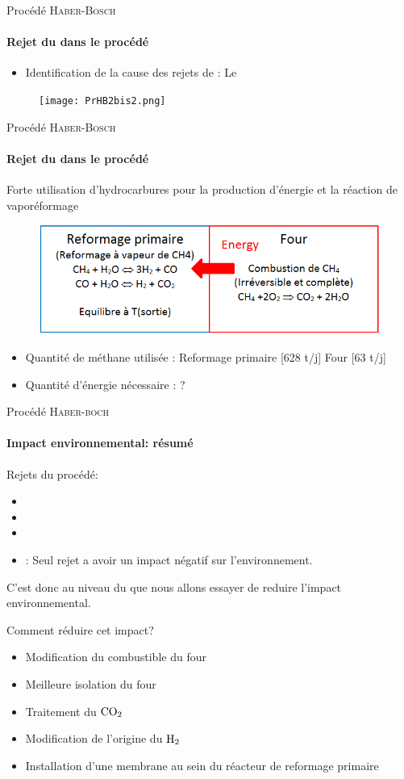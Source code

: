\documentclass{beamer}
\begin{document}
\begin{frame}{Procédé \textsc{Haber-Bosch}}
\framesubtitle{Rejet du  dans le procédé}
\begin{itemize}
\item Identification de la cause des rejets de : Le 
\end{itemize}
\begin{figure} [ht!]
\centering
\texttt{[image: PrHB2bis2.png]}
\end{figure}
\end{frame}

\begin{frame}{Procédé \textsc{Haber-Bosch}}
\framesubtitle{Rejet du  dans le procédé}
Forte utilisation d'hydrocarbures pour la production d'énergie et la réaction de vaporéformage
\begin{figure} [ht!]
\centering
\includegraphics[scale=0.4] {energie.png}
\end{figure}
\begin{itemize}
\item {Quantité de méthane utilisée : Reformage primaire [628 t/j] Four [63 t/j]}
\item {Quantité d'énergie nécessaire : ?}
\end{itemize}
\end{frame}

\begin{frame}{Procédé \textsc{Haber-boch}}
\framesubtitle{Impact environnemental: résumé}
Rejets du procédé:
\begin{itemize}
\item {}
\item {}
\item {}
\item {}: Seul rejet a avoir un impact négatif sur l'environnement.
\end{itemize}
C'est donc au niveau du  que nous allons essayer de reduire l'impact environnemental.
\end{frame}

\begin{frame}{Comment réduire cet impact?}
\begin{itemize}
\item {Modification du combustible du four}
\item {Meilleure isolation du four}
\item {Traitement du $\ce{CO_2}$}
\item {Modification de l'origine du $\ce{H_2}$}
\item {Installation d'une membrane au sein du réacteur de reformage primaire}
\end{itemize}
\end{frame}
\end{document}
